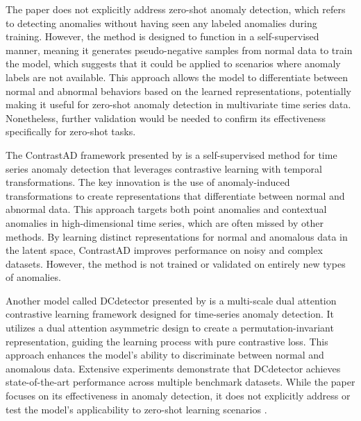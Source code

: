 The paper does not explicitly address zero-shot anomaly detection, which refers to detecting anomalies without having seen any labeled anomalies during training. However, the method is designed to function in a self-supervised manner, meaning it generates pseudo-negative samples from normal data to train the model, which suggests that it could be applied to scenarios where anomaly labels are not available. This approach allows the model to differentiate between normal and abnormal behaviors based on the learned representations, potentially making it useful for zero-shot anomaly detection in multivariate time series data. Nonetheless, further validation would be needed to confirm its effectiveness specifically for zero-shot tasks.

The ContrastAD framework presented by  is a self-supervised method for time series anomaly detection that leverages contrastive learning with temporal transformations. The key innovation is the use of anomaly-induced transformations to create representations that differentiate between normal and abnormal data. This approach targets both point anomalies and contextual anomalies in high-dimensional time series, which are often missed by other methods. By learning distinct representations for normal and anomalous data in the latent space, ContrastAD improves performance on noisy and complex datasets. However, the method is not trained or validated on entirely new types of anomalies.

Another model called DCdetector presented by  is a multi-scale dual attention contrastive learning framework designed for time-series anomaly detection. It utilizes a dual attention asymmetric design to create a permutation-invariant representation, guiding the learning process with pure contrastive loss. This approach enhances the model's ability to discriminate between normal and anomalous data. Extensive experiments demonstrate that DCdetector achieves state-of-the-art performance across multiple benchmark datasets. While the paper focuses on its effectiveness in anomaly detection, it does not explicitly address or test the model's applicability to zero-shot learning scenarios .

